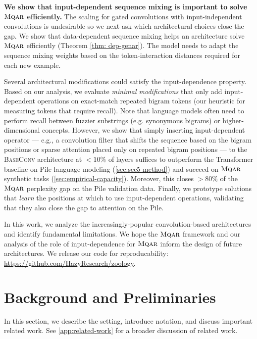 \textbf{We show that input-dependent sequence mixing is important to solve ${\textsc{Mqar}}$ efficiently.} The scaling for gated convolutions with input-independent convolutions is undesirable so we next ask which architectural choices close the gap. We show that data-dependent sequence mixing helps an architecture solve ${\textsc{Mqar}}$ efficiently (Theorem \ref{thm: dep-genar}). The model needs to adapt the sequence mixing weights based on the token-interaction distances required for each new example. 

Several architectural modifications could satisfy the input-dependence property. Based on our analysis, we evaluate \textit{minimal modifications} that only add input-dependent operations on exact-match repeated bigram tokens (our heuristic for measuring tokens that require recall). Note that language models often need to perform recall between fuzzier substrings (e.g. synonymous bigrams) or higher-dimensional concepts. However, we show that simply inserting input-dependent operator --- e.g., a convolution filter that shifts the sequence based on the bigram positions or sparse attention placed only on repeated bigram positions --- to the {\textsc{BaseConv}} architecture at $<10\%$ of layers suffices to outperform the Transformer baseline on Pile language modeling (\ref{sec:sec5-method}) and succeed on {$\textsc{Mqar}$} synthetic tasks (\ref{sec:empirical-capacity}). Moreover, this closes $>80\%$ of the {$\textsc{Mqar}$} perplexity gap on the Pile validation data. Finally, we prototype solutions that \textit{learn} the positions at which to use input-dependent operations, validating that they also close the gap to attention on the Pile.

In this work, we analyze the increasingly-popular convolution-based architectures and identify fundamental limitations. We hope the ${\textsc{Mqar}}$ framework and our analysis of the role of input-dependence for ${\textsc{Mqar}}$ inform the design of future architectures. We release our code for reproducability: \url{https://github.com/HazyResearch/zoology}.

\section{Background and Preliminaries}

\label{sec:ar-background}

In this section, we describe the setting, introduce notation, and discuss important related work. See \ref{app:related-work} for a broader discussion of related work. 

